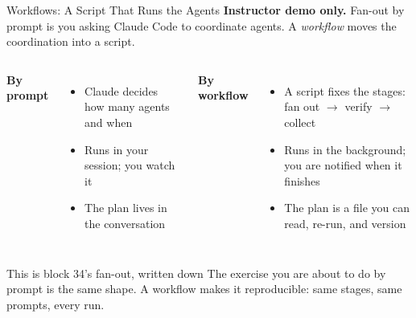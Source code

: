 \documentclass[aspectratio=169, 11pt]{beamer}
\begin{document}
\begin{frame}{Workflows: A Script That Runs the Agents}
  \textbf{Instructor demo only.}  Fan-out by prompt is you asking Claude Code to coordinate agents. A \emph{workflow} moves the coordination into a script.

  \vspace{0.4em}
  \begin{columns}[T]
    \textbf{By prompt}
    \begin{itemize}\small
      \item Claude decides how many agents and when
      \item Runs in your session; you watch it
      \item The plan lives in the conversation
    \end{itemize}

    \textbf{By workflow}
    \begin{itemize}\small
      \item A script fixes the stages: fan out $\rightarrow$ verify $\rightarrow$ collect
      \item Runs in the background; you are notified when it finishes
      \item The plan is a file you can read, re-run, and version
    \end{itemize}
  \end{columns}

  \vspace{0.5em}
  \begin{block}{This is block 34's fan-out, written down}
    The exercise you are about to do by prompt is the same shape. A workflow makes it reproducible: same stages, same prompts, every run.
  \end{block}
\end{frame}
\end{document}
